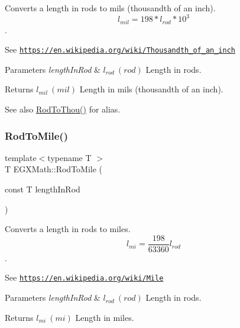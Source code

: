 Converts a length in rods to mils (thousandth of an inch). \[ l_{mil}=198 * l_{rod} * 10^{3} \]. 

See \href{https://en.wikipedia.org/wiki/Thousandth_of_an_inch}{\tt https\+://en.\+wikipedia.\+org/wiki/\+Thousandth\+\_\+of\+\_\+an\+\_\+inch} 
\begin{DoxyParams}{Parameters}
{\em length\+In\+Rod} & $ l_{rod}\ (rod)$ Length in rods. \\
\hline
\end{DoxyParams}
\begin{DoxyReturn}{Returns}
$ l_{mil}\ (mil)$ Length in mils (thousandth of an inch). 
\end{DoxyReturn}
\begin{DoxySeeAlso}{See also}
\mbox{\hyperlink{group___e_g_x_math-_conversions-_length_conversions-_imperial-_rod-_imperial_ga1bd077740ba076ebf1e9e99cbeddf6cf}{Rod\+To\+Thou()}} for alias. 
\end{DoxySeeAlso}
\mbox{\label{group___e_g_x_math-_conversions-_length_conversions-_imperial-_rod-_imperial_ga0ef0f9142bc6954af0961dabcf231abe}} 
\subsubsection{\texorpdfstring{Rod\+To\+Mile()}{RodToMile()}}
{\footnotesize\ttfamily template$<$typename T $>$ \\
T E\+G\+X\+Math\+::\+Rod\+To\+Mile (\begin{DoxyParamCaption}\item[{const T}]{length\+In\+Rod }\end{DoxyParamCaption})}



Converts a length in rods to miles. \[ l_{mi}=\frac{198}{63360} l_{rod} \]. 

See \href{https://en.wikipedia.org/wiki/Mile}{\tt https\+://en.\+wikipedia.\+org/wiki/\+Mile} 
\begin{DoxyParams}{Parameters}
{\em length\+In\+Rod} & $ l_{rod}\ (rod)$ Length in rods. \\
\hline
\end{DoxyParams}
\begin{DoxyReturn}{Returns}
$ l_{mi}\ (mi)$ Length in miles. 
\end{DoxyReturn}
\mbox{\label{group___e_g_x_math-_conversions-_length_conversions-_imperial-_rod-_imperial_ga1bd077740ba076ebf1e9e99cbeddf6cf}} 
